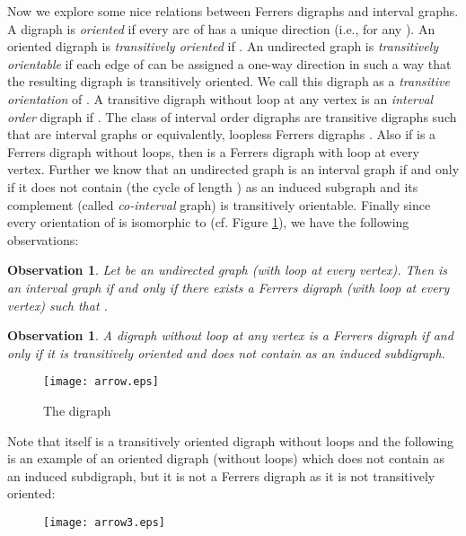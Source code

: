 \documentclass[11pt]{article}
\newtheorem{obs}[thm]{Observation}
\theoremstyle{definition}
\theoremstyle{remark}
\numberwithin{equation}{section}
\begin{document}
\vspace{1em} Now we explore some nice relations between Ferrers digraphs and interval graphs. A digraph  is {\em oriented} if every arc of  has a unique direction (i.e.,  for any ). An oriented digraph  is {\em transitively oriented} if . An undirected graph  is {\em transitively orientable} if each edge of  can be assigned a one-way direction in such a way that the resulting digraph is transitively oriented. We call this digraph as a {\em transitive orientation} of . A transitive digraph  without loop at any vertex is an {\em interval order} digraph if . The class of interval order digraphs are transitive digraphs  such that  are interval graphs \cite{Fi} or equivalently, loopless Ferrers digraphs \cite{P}. Also if  is a Ferrers digraph without loops, then  is a Ferrers digraph with loop at every vertex. Further we know that an undirected graph is an interval graph if and only if it does not contain  (the cycle of length ) as an induced subgraph and its complement (called {\em co-interval} graph) is transitively orientable.\cite{A} Finally since every orientation of  is isomorphic to  (cf. Figure \ref{fig:d1}), we have the following observations:

\begin{obs}\label{obs:alpha}
Let  be an undirected graph (with loop at every vertex). Then  is an interval graph if and only if there exists a Ferrers digraph  (with loop at every vertex) such that .
\end{obs}

\begin{obs}\label{lem:beta}
A digraph without loop at any vertex is a Ferrers digraph if and only if it is transitively oriented and does not contain  as an induced subdigraph.
\end{obs}

\begin{figure}[h]
\begin{center}
\texttt{[image: arrow.eps]}
\caption{The digraph }\label{fig:d1}
\end{center}
\end{figure}

Note that  itself is a transitively oriented digraph without loops  and the following is an example of an oriented digraph (without loops) which does not contain  as an induced subdigraph, but it is not a Ferrers digraph as it is not transitively oriented:

\begin{figure}[h]
\begin{center}
\texttt{[image: arrow3.eps]}
\end{center}
\end{figure}
\end{document}

